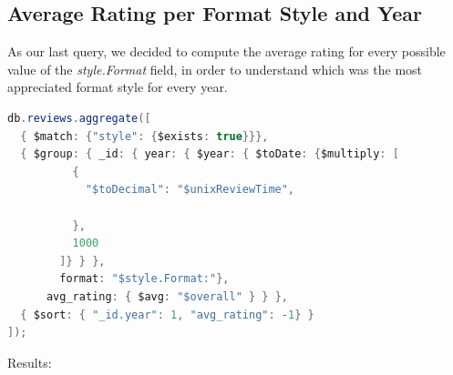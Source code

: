 \newpage
\subsection{Average Rating per Format Style and Year}
As our last query, we decided to compute the average rating for every possible value of the \textit{style.Format} field, in order to understand which was the most appreciated format style for every year. \\
\begin{lstlisting}[language=Java]
db.reviews.aggregate([
  { $match: {"style": {$exists: true}}},
  { $group: { _id: { year: { $year: { $toDate: {$multiply: [
          {
            "$toDecimal": "$unixReviewTime",
            
          },
          1000
        ]} } }, 
        format: "$style.Format:"}, 
      avg_rating: { $avg: "$overall" } } },
  { $sort: { "_id.year": 1, "avg_rating": -1} }
]);
\end{lstlisting}
Results:
